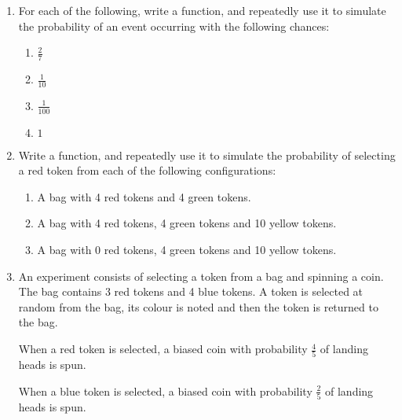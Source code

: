 \begin{enumerate}

\item 

For each of the following, write a function, and repeatedly use it to simulate
the probability of an event occurring with the following chances:
\begin{enumerate}

\item 

\(\frac{2}{7}\)

\item 

\(\frac{1}{10}\)

\item 

\(\frac{1}{100}\)

\item 

\(1\)

\end{enumerate}

\item 

Write a function, and repeatedly use it to simulate the probability of
selecting a red token from each of the following configurations:
\begin{enumerate}

\item 

A bag with 4 red tokens and 4 green tokens.

\item 

A bag with 4 red tokens, 4 green tokens and 10 yellow tokens.

\item 

A bag with 0 red tokens, 4 green tokens and 10 yellow tokens.

\end{enumerate}

\item 

An experiment consists of selecting a token from a bag and spinning a coin. The bag contains 3 red tokens and 4 blue tokens. A token is selected at random from the bag, its colour is noted and then the token is returned to the bag.


When a red token is selected, a biased coin with probability \(\frac{4}{5}\) of landing heads is spun.


When a blue token is selected, a biased coin with probability \(\frac{2}{5}\) of landing heads is spun.
\begin{enumerate}


\end{enumerate}
\end{enumerate}
